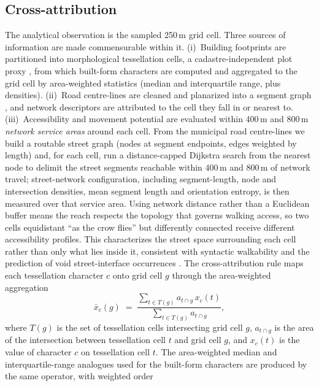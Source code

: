 \subsection{Cross-attribution}
\label{sec:methods-xattr}
The analytical observation is the sampled 250\,m grid cell. Three sources of
information are made commensurable within it. (i)~Building footprints are
partitioned into morphological tessellation cells, a cadastre-independent plot
proxy \citep{fleischmann2020Morphologic}, from which built-form characters are
computed and aggregated to the grid cell by area-weighted statistics (median and
interquartile range, plus densities). (ii)~Road centre-lines are cleaned and
planarized into a segment graph \citep{boeing2017Osmnx}, and network descriptors
are attributed to the cell they fall in or nearest to. (iii)~Accessibility and movement potential are evaluated within 400\,m and 800\,m
\emph{network service areas} around each cell. From the municipal road centre-lines we
build a routable street graph (nodes at segment endpoints, edges weighted by length)
and, for each cell, run a distance-capped Dijkstra search from the nearest node to
delimit the street segments reachable within 400\,m and 800\,m of network travel;
street-network configuration, including segment-length, node and intersection densities,
mean segment length and orientation entropy, is then measured over that service area.
Using network distance rather than a Euclidean buffer means the reach respects the
topology that governs walking access, so two cells equidistant ``as the crow flies''
but differently connected receive different accessibility profiles. This characterizes the street space surrounding each cell rather
than only what lies inside it, consistent with syntactic walkability and the
prediction of void street-interface occurrences \citep{tannous2021AccessibGreen,
de2023UnderstaPredicti}.
The cross-attribution rule maps each tessellation character $c$ onto grid cell
$g$ through the area-weighted aggregation
\begin{equation}\label{eq:xattr}
\bar{x}_{c}(g) \;=\; \frac{\sum_{t \in T(g)} a_{t \cap g}\, x_{c}(t)}
                        {\sum_{t \in T(g)} a_{t \cap g}},
\end{equation}
where $T(g)$ is the set of tessellation cells intersecting grid cell $g$,
$a_{t \cap g}$ is the area of the intersection between tessellation cell $t$ and
grid cell $g$, and $x_{c}(t)$ is the value of character $c$ on tessellation cell
$t$. The area-weighted median and interquartile-range analogues used for the
built-form characters are produced by the same operator, with weighted order
